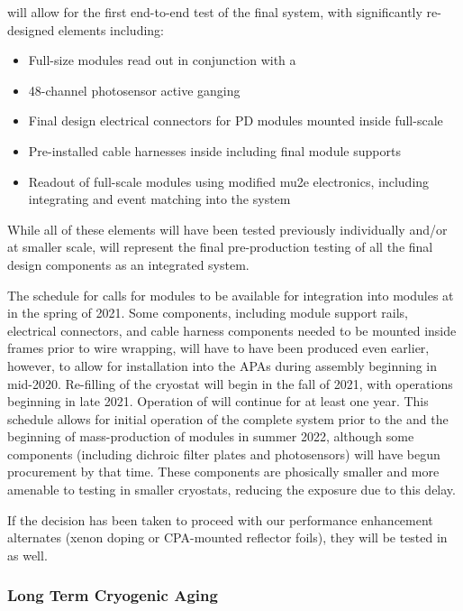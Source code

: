  will allow for the first end-to-end test of the final  system, with significantly re-designed elements including:
\begin{itemize}
    \item Full-size  modules read out in conjunction with a 
    \item \num{48}-channel photosensor active ganging
    \item Final design electrical connectors for PD modules mounted inside full-scale 
    \item Pre-installed cable harnesses inside  including final module supports
    \item Readout of full-scale  modules using modified mu2e electronics, including integrating  and  event matching into the  system
\end{itemize}

While all of these elements will have been tested previously individually and/or at smaller scale,  will represent the final pre-production testing of all the final design components as an integrated system.

The schedule for  calls for  modules to be available for integration into  modules at  in the spring of 2021.  Some components, including module support rails, electrical connectors, and cable harness components needed to be mounted inside  frames prior to wire wrapping, will have to have been produced even earlier, however, to allow for installation into the APAs during assembly beginning in mid-2020.  Re-filling of the  cryostat will begin in the fall of 2021, with operations beginning in late 2021.  Operation of  will continue for at least one year.  This schedule allows for initial operation of the complete system prior to the   and the beginning of mass-production of  modules in summer 2022, although some components (including dichroic filter plates and photosensors) will have begun procurement by that time.  These components are phosically smaller and more amenable to testing in smaller cryostats, reducing the exposure due to this delay.

If the decision has been taken to proceed with our performance enhancement alternates (xenon doping or CPA-mounted reflector foils), they will be tested in  as well.

\subsubsection{Long Term Cryogenic Aging}
\label{sec:valid-longtermaging}

